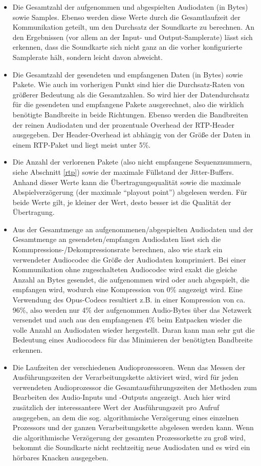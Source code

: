 \begin{itemize}
\item Die Gesamtzahl der aufgenommen und abgespielten Audiodaten (in Bytes) sowie Samples. Ebenso werden diese Werte durch die Gesamtlaufzeit der Kommunikation geteilt, um den Durchsatz der Soundkarte zu berechnen. An den Ergebnissen (vor allem an der Input- und Output-Samplerate) lässt sich erkennen, dass die Soundkarte sich nicht ganz an die vorher konfigurierte Samplerate hält, sondern leicht davon abweicht.
\item Die Gesamtzahl der gesendeten und empfangenen Daten (in Bytes) sowie Pakete. Wie auch im vorherigen Punkt sind hier die Durchsatz-Raten von größerer Bedeutung als die Gesamtzahlen. So wird hier der Datendurchsatz für die gesendeten und empfangene Pakete ausgerechnet, also die wirklich benötigte Bandbreite in beide Richtungen. Ebenso werden die Bandbreiten der reinen Audiodaten und der prozentuale Overhead der RTP-Header ausgegeben. Der Header-Overhead ist abhängig von der Größe der Daten in einem RTP-Paket und liegt meist unter 5\%.
\item Die Anzahl der verlorenen Pakete (also nicht empfangene Sequenznummern, siehe Abschnitt \ref{rtp}) sowie der maximale Füllstand der Jitter-Buffers. Anhand dieser Werte kann die Übertragungsqualität sowie die maximale Abspielverzögerung (der maximale \enquote{playout point}) abgelesen werden. Für beide Werte gilt, je kleiner der Wert, desto besser ist die Qualität der Übertragung.
\item Aus der Gesamtmenge an aufgenommenen/abgespielten Audiodaten und der Gesamtmenge an gesendeten/empfangen Audiodaten lässt sich die Kommpres\-sions-/Dekompressionsrate berechnen, also wie stark ein verwendeter Audiocodec die Größe der Audiodaten komprimiert. Bei einer Kommunikation ohne zugeschalteten Audiocodec wird exakt die gleiche Anzahl an Bytes gesendet, die aufgenommen wird oder auch abgespielt, die empfangen wird, wodurch eine Kompression von 0\% angezeigt wird. Eine Verwendung des Opus-Codecs resultiert z.B. in einer Kompression von ca. 96\%, also werden nur 4\% der aufgenommen Audio-Bytes über das Netzwerk versendet und auch aus den empfangenen 4\% beim Entpacken wieder die volle Anzahl an Audiodaten wieder hergestellt. Daran kann man sehr gut die Bedeutung eines Audiocodecs für das Minimieren der benötigten Bandbreite erkennen.
\item Die Laufzeiten der verschiedenen Audioprozessoren. Wenn das Messen der Ausführungszeiten der Verarbeitungskette aktiviert wird, wird für jeden verwendeten Audioprozessor die Gesamtausführungszeiten der Methoden zum Bearbeiten des Audio-Inputs und -Outputs angezeigt. Auch hier wird zusätzlich der interessantere Wert der Ausführungszeit pro Aufruf ausgegeben, an dem die sog. algorithmische Verzögerung eines einzelnen Prozessors und der ganzen Verarbeitungskette abgelesen werden kann. Wenn die algorithmische Verzögerung der gesamten Prozessorkette zu groß wird, bekommt die Soundkarte nicht rechtzeitig neue Audiodaten und es wird ein hörbares Knacken ausgegeben.
\end{itemize}

